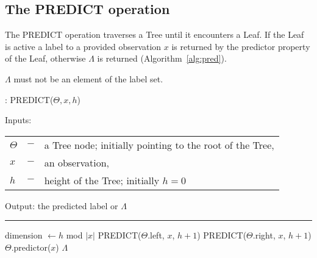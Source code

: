 \subsection{The PREDICT operation}

The PREDICT operation traverses a Tree until it encounters
a Leaf. If the Leaf is active a label to a provided
observation $x$ is returned by the predictor
property of the Leaf, otherwise $\Lambda$ is returned
(Algorithm~\ref{alg:pred}).

$\Lambda$ must not be an element of the label set.

\begin{algorithm}
  \caption{: PREDICT($\Theta, x, h$)}%
  \label{alg:pred}
  Inputs:

    \begin{tabu}{llX}
    $\Theta$ &$-$ &a Tree node; initially pointing to the
      root of the Tree,\\
    $x$ &$-$ &an observation,\\
    $h$ &$-$ &height of the Tree; initially $h = 0$
    \end{tabu}

  Output: the predicted label or $\Lambda$

  \noindent\rule{\linewidth}{0.4pt}

  \begin{algorithmic}[1]
      \STATE dimension $\leftarrow h$ mod $|x|$
        \STATE PREDICT($\Theta$.left, $x$, $h + 1$)
      \ELSE
        \STATE PREDICT($\Theta$.right, $x$, $h + 1$)
      \ENDIF
      \RETURN $\Theta$.predictor($x$)
    \ELSE
      \RETURN $\Lambda$
    \ENDIF
  \end{algorithmic}
\end{algorithm}
